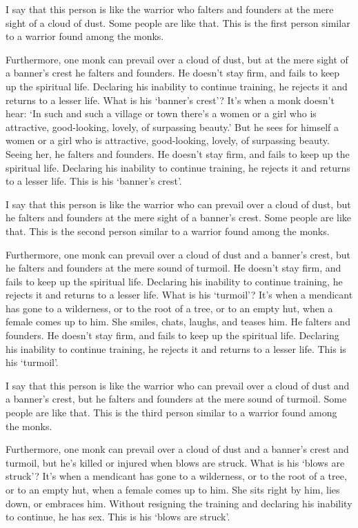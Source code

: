 \documentclass[12pt,openany]{book}%
\begin{document}
I say that this person is like the warrior who falters and founders at the mere sight of a cloud of dust. Some people are like that. This is the first person similar to a warrior found among the monks. 

Furthermore, one monk can prevail over a cloud of dust, but at the mere sight of a banner’s crest he falters and founders. He doesn’t stay firm, and fails to keep up the spiritual life. Declaring his inability to continue training, he rejects it and returns to a lesser life. What is his ‘banner’s crest’? It’s when a monk doesn’t hear: ‘In such and such a village or town there’s a women or a girl who is attractive, good-looking, lovely, of surpassing beauty.’ But he sees for himself a women or a girl who is attractive, good-looking, lovely, of surpassing beauty. Seeing her, he falters and founders. He doesn’t stay firm, and fails to keep up the spiritual life. Declaring his inability to continue training, he rejects it and returns to a lesser life. This is his ‘banner’s crest’. 

I say that this person is like the warrior who can prevail over a cloud of dust, but he falters and founders at the mere sight of a banner’s crest. Some people are like that. This is the second person similar to a warrior found among the monks. 

Furthermore, one monk can prevail over a cloud of dust and a banner’s crest, but he falters and founders at the mere sound of turmoil. He doesn’t stay firm, and fails to keep up the spiritual life. Declaring his inability to continue training, he rejects it and returns to a lesser life. What is his ‘turmoil’? It’s when a mendicant has gone to a wilderness, or to the root of a tree, or to an empty hut, when a female comes up to him. She smiles, chats, laughs, and teases him. He falters and founders. He doesn’t stay firm, and fails to keep up the spiritual life. Declaring his inability to continue training, he rejects it and returns to a lesser life. This is his ‘turmoil’. 

I say that this person is like the warrior who can prevail over a cloud of dust and a banner’s crest, but he falters and founders at the mere sound of turmoil. Some people are like that. This is the third person similar to a warrior found among the monks. 

Furthermore, one monk can prevail over a cloud of dust and a banner’s crest and turmoil, but he’s killed or injured when blows are struck. What is his ‘blows are struck’? It’s when a mendicant has gone to a wilderness, or to the root of a tree, or to an empty hut, when a female comes up to him. She sits right by him, lies down, or embraces him. Without resigning the training and declaring his inability to continue, he has sex. This is his ‘blows are struck’. 
\end{document}
